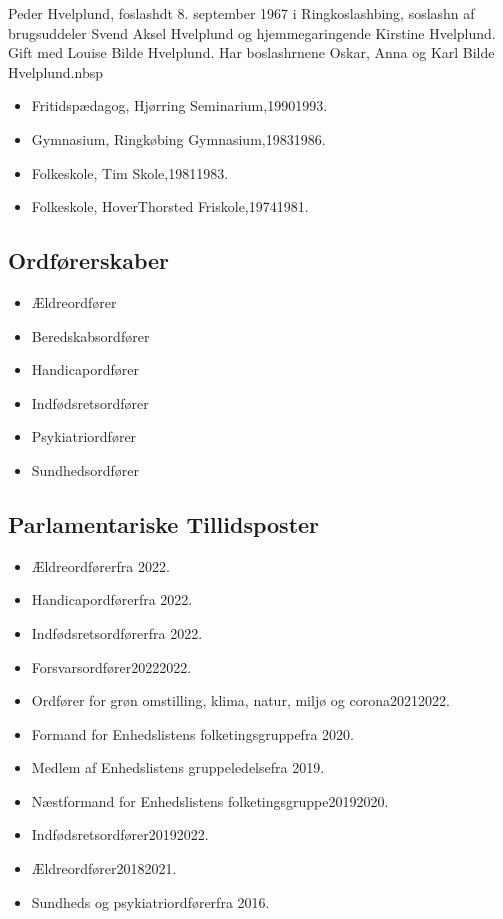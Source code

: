 \documentclass[11pt, a4paper]{awesome-cv}
\begin{document}
\makecvheader[R]
\makelettertitle
\begin{cvletter}
Peder Hvelplund, foslashdt 8. september 1967 i Ringkoslashbing, soslashn af brugsuddeler Svend Aksel Hvelplund og hjemmegaringende Kirstine Hvelplund. Gift med Louise Bilde Hvelplund. Har boslashrnene Oskar, Anna og Karl Bilde Hvelplund.nbsp

\begin{itemize}
\item Fritidspædagog, Hjørring Seminarium,19901993.
\item Gymnasium, Ringkøbing Gymnasium,19831986.
\item Folkeskole, Tim Skole,19811983.
\item Folkeskole, HoverThorsted Friskole,19741981.
\end{itemize}
\subsection*{Ordførerskaber}
\begin{itemize}
\item Ældreordfører
\item Beredskabsordfører
\item Handicapordfører
\item Indfødsretsordfører
\item Psykiatriordfører
\item Sundhedsordfører
\end{itemize}
\subsection*{Parlamentariske Tillidsposter}
\begin{itemize}
\item Ældreordførerfra 2022.
\item Handicapordførerfra 2022.
\item Indfødsretsordførerfra 2022.
\item Forsvarsordfører20222022.
\item Ordfører for grøn omstilling, klima, natur, miljø og corona20212022.
\item Formand for Enhedslistens folketingsgruppefra 2020.
\item Medlem af Enhedslistens gruppeledelsefra 2019.
\item Næstformand for Enhedslistens folketingsgruppe20192020.
\item Indfødsretsordfører20192022.
\item Ældreordfører20182021.
\item Sundheds og psykiatriordførerfra 2016.
\end{itemize}

\end{cvletter}
\end{document}
